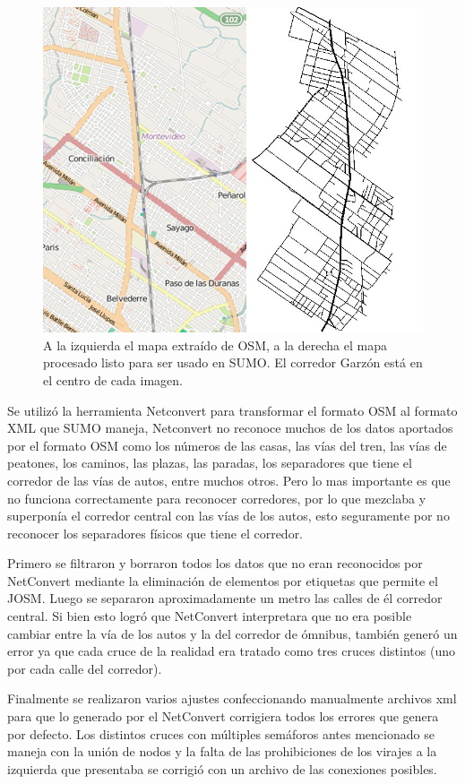 \begin{figure}[H]
	\centering
	\includegraphics[width=0.9\linewidth]{Figures/mapa_osm_sumo}
	\caption{A la izquierda el mapa extraído de OSM, a la derecha el mapa procesado listo para ser usado en SUMO. El corredor Garzón está en el centro de cada imagen.}
	\label{fig:mapa_osm_sumo}
\end{figure}

Se utilizó la herramienta Netconvert para transformar el formato OSM al formato XML que SUMO maneja, Netconvert no reconoce muchos de los datos aportados por el formato OSM como los números de las casas, las vías del tren, las vías de peatones, los caminos, las plazas, las paradas, los separadores que tiene el corredor de las vías de autos, entre muchos otros. Pero lo mas importante es que no funciona correctamente para reconocer corredores, por lo que mezclaba y superponía el corredor central con las vías de los autos, esto seguramente por no reconocer los separadores físicos que tiene el corredor. 

Primero se filtraron y borraron todos los datos que no eran reconocidos por NetConvert mediante la eliminación de elementos por etiquetas que permite el 
JOSM. Luego se separaron aproximadamente un metro las calles de él corredor central. Si bien esto logró que NetConvert interpretara que no era posible cambiar entre la vía de los autos y la del corredor de ómnibus, también generó un error ya que cada cruce de la realidad era tratado como tres cruces distintos (uno por cada calle del corredor).

Finalmente se realizaron varios ajustes confeccionando manualmente archivos xml para que lo generado por el NetConvert corrigiera todos los errores que genera por defecto. Los distintos cruces con múltiples semáforos antes mencionado se maneja con la unión de nodos y la falta de las prohibiciones de los virajes a la izquierda que presentaba se corrigió con un archivo de las conexiones posibles.

